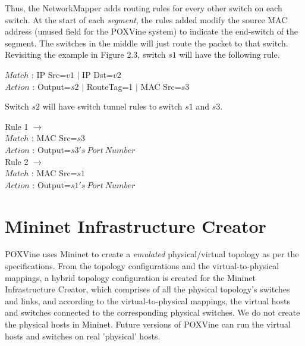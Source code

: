 Thus, the NetworkMapper adds routing rules for every other switch on each switch. At the start of each \emph{segment}, the rules added modify the source MAC address (unused field for the POXVine system) to indicate the end-switch of the segment. The switches in the middle will just route the packet to that switch. Revisiting the example in Figure 2.3, switch $s1$ will have the following rule. 
\begin{center}
	$Match$ : IP Src=$v1$ $|$ IP Dst=$v2$ \\
	$Action$ : Output=$s2$ $|$ RouteTag=1 $|$ MAC Src=$s3$\\
\end{center}

Switch $s2$ will have switch tunnel rules to switch $s1$ and $s3$. 
\begin{center}
	Rule 1 $\rightarrow$\\
	$Match$ : MAC Src=$s3$ \\
	$Action$ : Output=$s3's\ Port\ Number$ \\
	Rule 2 $\rightarrow$\\
	$Match$ : MAC Src=$s1$ \\
	$Action$ : Output=$s1's\ Port\ Number$ \\	
\end{center}

\section{Mininet Infrastructure Creator}
POXVine uses Mininet to create a \emph{emulated} physical/virtual topology as per the specifications. From the topology configurations and the virtual-to-physical mappings, a hybrid topology configuration is created for the Mininet Infrastructure Creator, which comprises of all the physical topology's switches and links, and according to the virtual-to-physical mappings, the virtual hosts and switches connected to the corresponding physical switches. We do not create the physical hosts in Mininet. Future versions of POXVine can run the virtual hosts and switches on real 'physical' hosts.








 

